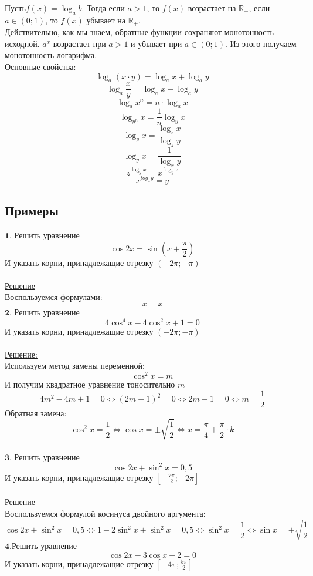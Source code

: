 \documentclass{article}
\begin{document}
Пусть\( f(x) = \log_a b \). Тогда если \( a > 1 \), то 
\( f(x) \) возрастает на $\mathbb{R}_+$, если \( a \in (0; 1) \), то
\( f(x) \) убывает на $\mathbb{R}_+$. \\
Действительно, как мы знаем, обратные функции сохраняют монотонность исходной.
\( a^x \) возрастает при $a > 1$ и убывает при \( a \in (0; 1) \). Из этого получаем
монотонность логарифма. \\ 
Основные свойства:
\[ \log_a (x \cdot y) = \log_a x + \log_a y \]
\[ \log_a \frac{x}{y} = \log_a x - \log_a y \]
\[ \log_a x^n = n \cdot \log_a x \]
\[ \log_{y^n} x = \frac{1}{n} \log_y x \] 
\[ \log_y x = \frac{\log_z x}{\log_z y} \]
\[ \log_y x = \frac{1}{\log_x y} \]
\[ z^{\log_y x} = x^{\log_y z} \]
\[ x^{log_x y} = y \]
\subsection{Примеры}
$\mathbf{1}$. Решить уравнение 
\[\cos 2x = \sin\left( x + \frac{\pi}{2}\right)\]
И указать корни, принадлежащие отрезку \( (-2\pi; -\pi)\) \\ \\
\underline{Решение}
\\
Воспользуемся формулами:
\[ 
x = x
\]
$\mathbf{2}$. Решить уравнение
\[ 4 \cos^4 x - 4\cos^2 x + 1 = 0 \]
И указать корни, принадлежащие отрезку \( (-2\pi; -\pi) \) \\ \\
\underline{Решение:} \\
Используем метод замены переменной:
\[ \cos^2 x = m \]
И получим квадратное уравнение тоносительно $m$
\[ 4m^2 - 4m + 1 = 0 
\Leftrightarrow 
(2m - 1)^2 = 0 
\Leftrightarrow
2m - 1 = 0
\Leftrightarrow
m = \frac{1}{2}
\]
Обратная замена:
\[
\cos^2 x = \frac{1}{2}
\Leftrightarrow
\cos x = \pm \sqrt{\frac{1}{2}}
\Leftrightarrow
x = \frac{\pi}{4} + \frac{\pi}{2} \cdot k
\]
\\
$\mathbf{3}$. Решить уравнение
\[ \cos 2x + \sin^2 x = 0,5 \]
И указать корни, принадлежащие отрезку \( [-\frac{7\pi}{2}; -2\pi] \) \\ \\
\underline{Решение}
\\
Воспользуемся формулой косинуса двойного аргумента:
\[
\cos 2x + \sin^2 x = 0,5
\Leftrightarrow
1 - 2\sin^2 x + \sin^2 x = 0,5
\Leftrightarrow
\sin^2 x = \frac{1}{2}
\Leftrightarrow
\sin x = \pm \sqrt{\frac{1}{2}}
\]
$\mathbf{4}$.Решить уравнение
\[ \cos 2x -3\cos x + 2 = 0  \]
И указать корни, принадлежащие отрезку \( [-4\pi; \frac{5\pi}{2}] \) \\ 
\end{document}
